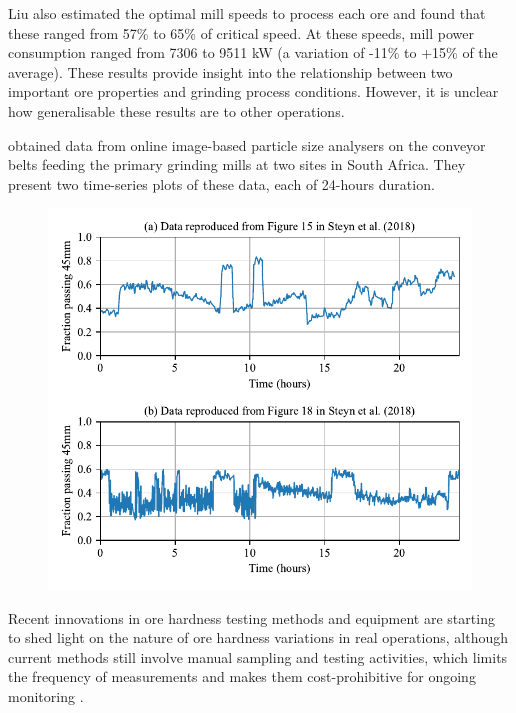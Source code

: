 Liu also estimated the optimal mill speeds to process each ore and found that these ranged from 57\% to 65\% of critical speed. At these speeds, mill power consumption ranged from 7306 to 9511 kW (a variation of -11\% to +15\% of the average). These results provide insight into the relationship between two important ore properties and grinding process conditions. However, it is unclear how generalisable these results are to other operations.

\cite{steyn_investigating_2018} obtained data from online image-based particle size analysers on the conveyor belts feeding the primary grinding mills at two sites in South Africa. They present two time-series plots of these data, each of 24-hours duration. %
\begin{figure}[htp]
	\centering
	\includegraphics[width=13cm]{images/tsdata-steyn-figs.pdf}
	\caption{}
	\label{fig:ind-data-tsplots}
\end{figure}

Recent innovations in ore hardness testing methods and equipment are starting to shed light on the nature of ore hardness variations in real operations, although current methods still involve manual sampling and testing activities, which limits the frequency of measurements and makes them cost-prohibitive for ongoing monitoring \citep{kojovic_value_2019}.


